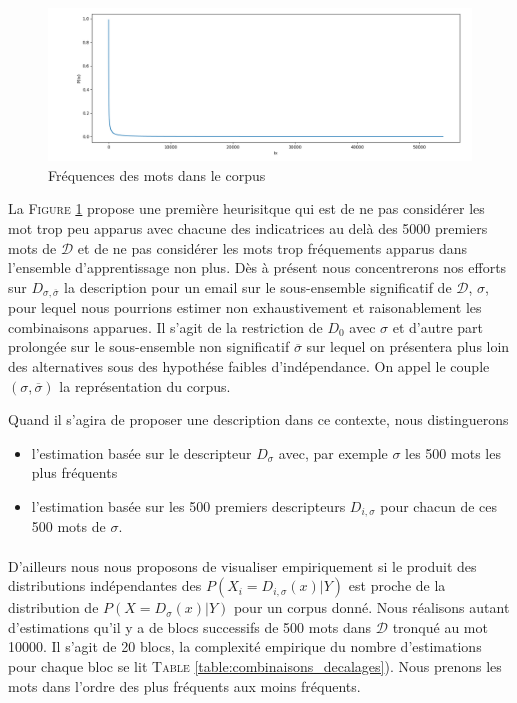 \documentclass[a4paper, french]{article}
\begin{document}
\begin{figure}[h]
\begin{center}
    \caption{Fr\'equences des mots dans le corpus}
    \includegraphics[width=13cm]{repr0}
\end{center}
\label{fig:repr0}
\end{figure}

La F\textsc{igure} \ref{fig:repr0} propose une premi\`ere heurisitque qui est
de ne pas consid\'erer les mot trop peu apparus avec chacune des indicatrices
au del\`a des 5000 premiers mots de $\mathcal{D}$ et de ne pas consid\'erer 
les mots trop fr\'equements apparus dans l'ensemble d'apprentissage non plus.
D\`es \`a pr\'esent nous concentrerons nos efforts sur $D_{\sigma,\overline\sigma}$
la description pour un email sur le sous-ensemble significatif de
$\mathcal{D}$, $\sigma$, pour lequel nous pourrions estimer non exhaustivement
et raisonablement les combinaisons apparues. Il s'agit de la restriction de
$D_0$ avec $\sigma$ et d'autre part prolong\'ee sur le sous-ensemble 
non significatif $\overline\sigma$ sur lequel on pr\'esentera plus loin 
des alternatives sous des hypoth\'ese faibles d'ind\'ependance. 
On appel le couple $(\sigma, \overline\sigma)$ la repr\'esentation du corpus.

Quand il s'agira de proposer une description dans ce contexte, nous distinguerons
\begin{itemize}
    \item l'estimation bas\'ee sur le descripteur $D_\sigma$ avec, par exemple
        $\sigma$ les 500 mots les plus fr\'equents
    \item l'estimation bas\'ee sur les 500 premiers descripteurs $D_{i,\sigma}$
        pour chacun de ces 500 mots de $\sigma$.
\end{itemize}

\paragraph{}
D'ailleurs nous nous proposons de visualiser empiriquement si le produit des
distributions ind\'ependantes des $P(X_i=D_{i,\sigma}(x)|Y)$  est proche de la distribution
de $P(X=D_{\sigma}(x)|Y)$ pour un corpus donn\'e. Nous r\'ealisons autant d'estimations
qu'il y a de blocs successifs de 500 mots dans $\mathcal{D}$ tronqu\'e au mot 10000. 
%
Il s'agit de 20 blocs, la complexit\'e empirique du nombre d'estimations 
pour chaque bloc se lit T\textsc{able} \ref{table:combinaisons_decalages}). 
%
Nous prenons les mots dans l'ordre des plus fr\'equents aux moins fr\'equents.
\end{document}
